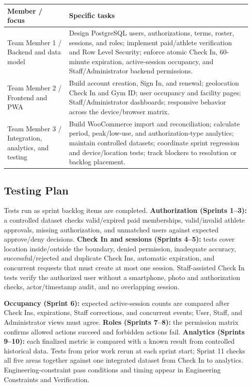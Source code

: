 \documentclass[11pt,letterpaper]{article}
\begin{document}
\begin{center}
\small
\begin{tabularx}{0.95\textwidth}{L{3.4cm} X}
\toprule
\textbf{Member / focus} & \textbf{Specific tasks} \\
\midrule
Team Member 1 / Backend and data model & Design PostgreSQL users, authorizations, terms, roster, sessions, and roles; implement paid/athlete verification and Row Level Security; enforce atomic Check In, 60-minute expiration, active-session occupancy, and Staff/Administrator backend permissions. \\
\addlinespace
Team Member 2 / Frontend and PWA & Build account creation, Sign In, and renewal; geolocation Check In and Gym ID; user occupancy and facility pages; Staff/Administrator dashboards; responsive behavior across the device/browser matrix. \\
\addlinespace
Team Member 3 / Integration, analytics, and testing & Build WooCommerce import and reconciliation; calculate period, peak/low-use, and authorization-type analytics; maintain controlled datasets; coordinate sprint regression and device/location tests; track blockers to resolution or backlog placement. \\
\bottomrule
\end{tabularx}
\end{center}

\subsection{Testing Plan}

Tests run as sprint backlog items are completed. \textbf{Authorization (Sprints 1--3):} a controlled dataset checks valid/expired paid memberships, valid/invalid athlete approvals, missing authorization, and unmatched users against expected approve/deny decisions. \textbf{Check In and sessions (Sprints 4--5):} tests cover location inside/outside the boundary, denied permission, inadequate accuracy, successful/rejected and duplicate Check Ins, automatic expiration, and concurrent requests that must create at most one session. Staff-assisted Check In tests verify the authorized user without a smartphone, photo and authorization checks, actor/timestamp audit, and no overlapping session.

\textbf{Occupancy (Sprint 6):} expected active-session counts are compared after Check Ins, expirations, Staff corrections, and concurrent events; User, Staff, and Administrator views must agree. \textbf{Roles (Sprints 7--8):} the permission matrix confirms allowed actions succeed and forbidden actions fail. \textbf{Analytics (Sprints 9--10):} each finalized metric is compared with a known result from controlled historical data. Tests from prior work rerun at each sprint start; Sprint 11 checks all five areas together against one integrated dataset from Check In to analytics. Engineering-constraint pass conditions and timing appear in Engineering Constraints and Verification.
\end{document}

